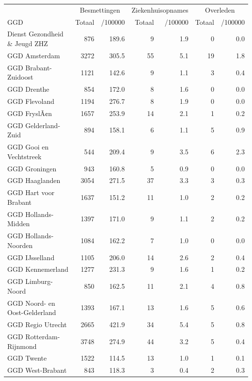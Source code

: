 \documentclass[
  english,
  man,floatsintext]{apa6}
\begin{document}
\begin{table}
\centering\begingroup\fontsize{10}{12}\selectfont

\begin{threeparttable}
\begin{tabular}{lrrrrrr}
\toprule
\multicolumn{1}{c}{ } & \multicolumn{2}{c}{Besmettingen} & \multicolumn{2}{c}{Ziekenhuisopnames} & \multicolumn{2}{c}{Overleden} \\
\cmidrule(l{3pt}r{3pt}){2-3} \cmidrule(l{3pt}r{3pt}){4-5} \cmidrule(l{3pt}r{3pt}){6-7}
GGD & Totaal & /100000 & Totaal & /100000 & Totaal & /100000\\
\midrule
Dienst Gezondheid \& Jeugd ZHZ & 876 & 189.6 & 9 & 1.9 & 0 & 0.0\\
GGD Amsterdam & 3272 & 305.5 & 55 & 5.1 & 19 & 1.8\\
GGD Brabant-Zuidoost & 1121 & 142.6 & 9 & 1.1 & 3 & 0.4\\
GGD Drenthe & 854 & 172.0 & 8 & 1.6 & 0 & 0.0\\
GGD Flevoland & 1194 & 276.7 & 8 & 1.9 & 0 & 0.0\\
GGD FryslÃ¢n & 1657 & 253.9 & 14 & 2.1 & 1 & 0.2\\
GGD Gelderland-Zuid & 894 & 158.1 & 6 & 1.1 & 5 & 0.9\\
GGD Gooi en Vechtstreek & 544 & 209.4 & 9 & 3.5 & 6 & 2.3\\
GGD Groningen & 943 & 160.8 & 5 & 0.9 & 0 & 0.0\\
GGD Haaglanden & 3054 & 271.5 & 37 & 3.3 & 3 & 0.3\\
GGD Hart voor Brabant & 1637 & 151.2 & 11 & 1.0 & 2 & 0.2\\
GGD Hollands-Midden & 1397 & 171.0 & 9 & 1.1 & 2 & 0.2\\
GGD Hollands-Noorden & 1084 & 162.2 & 7 & 1.0 & 0 & 0.0\\
GGD IJsselland & 1105 & 206.0 & 14 & 2.6 & 2 & 0.4\\
GGD Kennemerland & 1277 & 231.3 & 9 & 1.6 & 1 & 0.2\\
GGD Limburg-Noord & 850 & 162.5 & 11 & 2.1 & 4 & 0.8\\
GGD Noord- en Oost-Gelderland & 1393 & 167.1 & 13 & 1.6 & 5 & 0.6\\
GGD Regio Utrecht & 2665 & 421.9 & 34 & 5.4 & 5 & 0.8\\
GGD Rotterdam-Rijnmond & 3748 & 274.9 & 44 & 3.2 & 5 & 0.4\\
GGD Twente & 1522 & 114.5 & 13 & 1.0 & 1 & 0.1\\
GGD West-Brabant & 843 & 118.3 & 3 & 0.4 & 2 & 0.3\\

\end{tabular}
\end{threeparttable}
\end{table}
\end{document}
